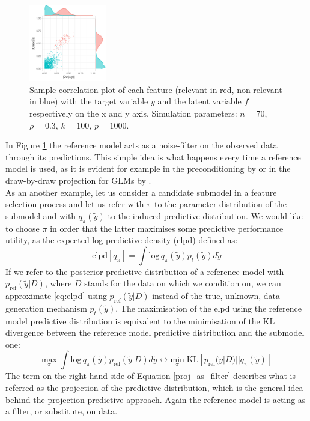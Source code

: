 \documentclass[american,]{article}
\theoremstyle{definition}
\begin{document}
\begin{figure}[tp]
  \centering
  \includegraphics[width=0.3\textwidth]{graphics/correlation.pdf}
  \caption{Sample correlation plot of each feature (relevant in red, non-relevant in blue) with the target variable $y$ and the latent variable $f$ respectively on the x and y axis. Simulation parameters: $n=70$, $\rho=0.3$, $k=100$, $p=1000$.\\}
  \label{fig:correlation}
\end{figure}

In Figure \ref{fig:correlation} the reference model acts as a noise-filter on the observed data through its predictions. This simple idea is what happens every time a reference model is used, as it is evident for example in the preconditioning by \cite{paper:paul_preconditioning} or in the draw-by-draw projection for GLMs by \cite{paper:original_proj}.\\
As an another example, let us consider a candidate submodel in a feature selection process and let us refer with $\pi$ to the parameter distribution of the submodel and with $q_{\pi}(\tilde{y})$ to the induced predictive distribution. We would like to choose $\pi$ in order that the latter maximises some predictive performance utility, as the expected log-predictive density (elpd) defined as:
\
\begin{equation}\label{eq:elpd}
\text{elpd}[q_{\pi}]=\int \text{log}\,q_{\pi}(\tilde{y})p_{t}(\tilde{y})d\tilde{y} 
\end{equation}
If we refer to the posterior predictive distribution of a reference model with $p_{\text{ref}}(\tilde{y}|D)$, where $D$ stands for the data on which we condition on, we can approximate \eqref{eq:elpd} using $p_{\text{ref}}(\tilde{y}|D)$ instead of the true, unknown, data generation mechanism $p_{t}(\tilde{y})$. The maximisation of the elpd using the reference model predictive distribution is equivalent to the minimisation of the KL divergence between the reference model predictive distribution and the submodel one:
\
\begin{equation} \label{proj_as_filter}
\underset{\pi}{\text{max}} \; \int \text{log}\,q_{\pi}(\tilde{y})p_{\text{ref}}(\tilde{y}|D)d\tilde{y} \leftrightarrow \underset{\pi}{\text{min}} \; \text{KL}[p_{\text{ref}}(\tilde{y}|D)||q_{\pi}(\tilde{y})] 
\end{equation}
The term on the right-hand side of Equation \eqref{proj_as_filter} describes what is referred as the projection of the predictive distribution, which is the general idea behind the projection predictive approach. Again the reference model is acting as a filter, or substitute, on data.
\end{document}
